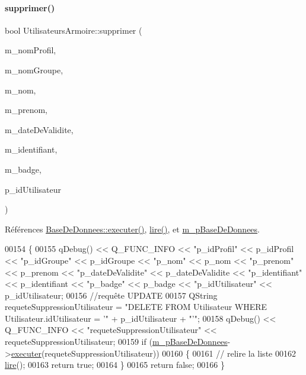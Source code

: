 \paragraph{\texorpdfstring{supprimer()}{supprimer()}}
{\footnotesize\ttfamily bool Utilisateurs\+Armoire\+::supprimer (\begin{DoxyParamCaption}\item[{Q\+String}]{m\+\_\+nom\+Profil,  }\item[{Q\+String}]{m\+\_\+nom\+Groupe,  }\item[{Q\+String}]{m\+\_\+nom,  }\item[{Q\+String}]{m\+\_\+prenom,  }\item[{Q\+String}]{m\+\_\+date\+De\+Validite,  }\item[{Q\+String}]{m\+\_\+identifiant,  }\item[{Q\+String}]{m\+\_\+badge,  }\item[{Q\+String}]{p\+\_\+id\+Utilisateur }\end{DoxyParamCaption})}



Références \hyperlink{class_base_de_donnees_aa8de5f8f8bb17edc43f5c0ee33712081}{Base\+De\+Donnees\+::executer()}, \hyperlink{class_utilisateurs_armoire_a10b2038874606c0afccf0f18c038dd0c}{lire()}, et \hyperlink{class_utilisateurs_armoire_ac43b4894f5036117d044ad2d22b09318}{m\+\_\+p\+Base\+De\+Donnees}.


\begin{DoxyCode}
00154 \{
00155     qDebug() << Q\_FUNC\_INFO << \textcolor{stringliteral}{"p\_idProfil"} << p\_idProfil << \textcolor{stringliteral}{"p\_idGroupe"} << p\_idGroupe << \textcolor{stringliteral}{"p\_nom"} << p\_nom
       << \textcolor{stringliteral}{"p\_prenom"} << p\_prenom << \textcolor{stringliteral}{"p\_dateDeValidite"} << p\_dateDeValidite << \textcolor{stringliteral}{"p\_identifiant"} << p\_identifiant << \textcolor{stringliteral}{
      "p\_badge"} << p\_badge << \textcolor{stringliteral}{"p\_idUtilisateur"} << p\_idUtilisateur;
00156     \textcolor{comment}{//requête UPDATE}
00157     QString requeteSuppressionUtilisateur = \textcolor{stringliteral}{"DELETE FROM Utilisateur WHERE Utilisateur.idUtilisateur = '"} +
       p\_idUtilisateur + \textcolor{stringliteral}{"'"};
00158     qDebug() << Q\_FUNC\_INFO << \textcolor{stringliteral}{"requeteSuppressionUtilisateur"} << requeteSuppressionUtilisateur;
00159     \textcolor{keywordflow}{if} (\hyperlink{class_utilisateurs_armoire_ac43b4894f5036117d044ad2d22b09318}{m\_pBaseDeDonnees}->\hyperlink{class_base_de_donnees_aa8de5f8f8bb17edc43f5c0ee33712081}{executer}(requeteSuppressionUtilisateur))
00160     \{
00161         \textcolor{comment}{// relire la liste}
00162         \hyperlink{class_utilisateurs_armoire_a10b2038874606c0afccf0f18c038dd0c}{lire}();
00163         \textcolor{keywordflow}{return} \textcolor{keyword}{true};
00164     \}
00165     \textcolor{keywordflow}{return} \textcolor{keyword}{false};
00166 \}
\end{DoxyCode}


